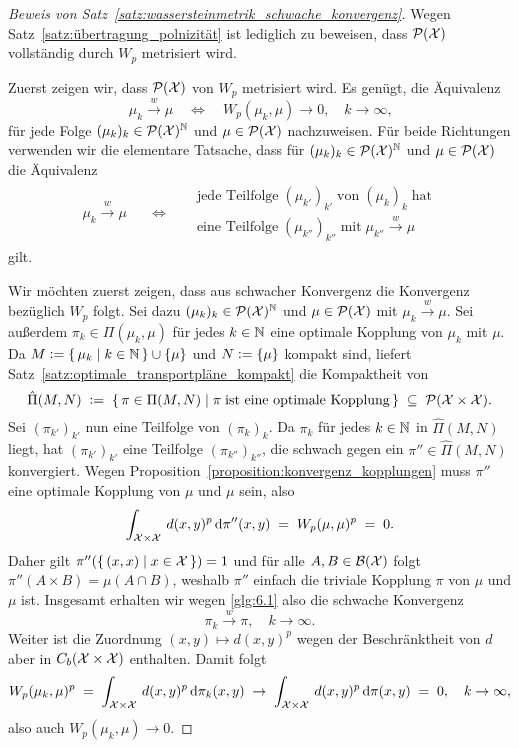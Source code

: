 \documentclass[../thesis/thesis.tex]{subfiles}
\begin{document}
	\begin{proof}[Beweis von Satz~\ref{satz:wassersteinmetrik_schwache_konvergenz}]
		Wegen Satz~\ref{satz:übertragung_polnizität} ist lediglich zu beweisen, dass $\mathcal{P}(\mathcal{X})$ vollständig durch $W_p$ metrisiert wird. 
		
		Zuerst zeigen wir, dass $\mathcal{P}(\mathcal{X})$ von $W_p$ metrisiert wird. Es genügt, die Äquivalenz
		\[ \mu_k \xrightarrow{w} \mu \quad \iff \quad W_p(\mu_k, \mu) \to 0, \quad k \to \infty \text{,} \]
		für jede Folge $(\mu_k)_k \in \mathcal{P}(\mathcal{X})^{\mathbb{N}}$ und $\mu \in \mathcal{P}(\mathcal{X})$ nachzuweisen.
		Für beide Richtungen verwenden wir die elementare Tatsache, dass für $(\mu_k)_k \in \mathcal{P}(\mathcal{X})^{\mathbb{N}}$ und $\mu \in \mathcal{P}(\mathcal{X})$ die Äquivalenz
		\[ \begin{matrix}
			\mu_k \xrightarrow{w} \mu \quad & \iff & \quad \begin{array}{lr}
				\text{jede Teilfolge} \; (\mu_{k'})_{k'} \; \text{von} \; (\mu_k)_k \; \text{hat} \\
				\text{eine Teilfolge} \; (\mu_{k''})_{k''} \; \text{mit} \; \mu_{k''} \xrightarrow{w} \mu
			\end{array} \label{glg:6.1} \tag{6.1}
		\end{matrix} \]
		gilt.
		
		Wir möchten zuerst zeigen, dass aus schwacher Konvergenz die Konvergenz bezüglich $W_p$ folgt. Sei dazu $(\mu_k)_k \in \mathcal{P}(\mathcal{X})^{\mathbb{N}}$ und $\mu \in \mathcal{P}(\mathcal{X})$ mit $\mu_k \xrightarrow{w} \mu$. Sei außerdem $\pi_k \in \Pi(\mu_k, \mu)$ 
		für jedes $k \in \mathbb{N}$ eine optimale Kopplung von $\mu_k$ mit $\mu$. 
		Da $M \vcentcolon = \left\{\, \mu_k \; \middle| \; k \in \mathbb{N} \,\right\} \cup \left\{\mu\right\}$ und $N \vcentcolon = \left\{\mu\right\}$ kompakt sind, liefert Satz~\ref{satz:optimale_transportpläne_kompakt} die Kompaktheit von
		\[ \hat{\Pi}(M, N) \; \vcentcolon = \; \left\{\, \pi \in \Pi(M, N) \; \middle| \; \pi \; \text{ist eine optimale Kopplung} \,\right\} \; \subseteq \; \mathcal{P}(\mathcal{X} \times \mathcal{X}) \text{.} \]
		Sei $(\pi_{k'})_{k'}$ nun eine Teilfolge von $(\pi_k)_k$. Da $\pi_k$ für jedes $k \in \mathbb{N}$ in $\hat{\Pi}(M, N)$ liegt, hat $(\pi_{k'})_{k'}$ eine Teilfolge $(\pi_{k''})_{k''}$, 
		die schwach gegen ein $\pi'' \in \hat{\Pi}(M, N)$ konvergiert. Wegen Proposition~\ref{proposition:konvergenz_kopplungen} muss $\pi''$ eine optimale Kopplung von $\mu$ und $\mu$ sein, also
		\[ \int_{\mathcal{X} \times \mathcal{X}} \, d(x, y)^p \, \mathrm{d}\pi''(x, y) \; = \; W_p(\mu, \mu)^p \; = \; 0 \text{.} \]
		Daher gilt $\pi''(\left\{\, (x, x) \; \middle| \; x \in \mathcal{X} \,\right\}) = 1$ und für alle $A, B \in \mathcal{B}(\mathcal{X})$ folgt $\pi''(A \times B) = \mu(A \cap B)$, weshalb $\pi''$ einfach die 
		triviale Kopplung $\pi$ von $\mu$ und $\mu$ ist. Insgesamt erhalten wir wegen \eqref{glg:6.1} also die schwache Konvergenz
		\[ \pi_k \xrightarrow{w} \pi, \quad k \to \infty \text{.} \] 
		Weiter ist die Zuordnung $(x, y) \mapsto d(x, y)^p$ wegen der Beschränktheit von $d$ aber in $C_b(\mathcal{X} \times \mathcal{X})$ enthalten. Damit folgt 
		\[ W_p(\mu_k, \mu)^p \; = \; \int_{\mathcal{X} \times \mathcal{X}} \, d(x, y)^p \, \mathrm{d}\pi_k(x, y) \; \to \; \int_{\mathcal{X} \times \mathcal{X}} \, d(x, y)^p \, \mathrm{d}\pi(x, y) \; = \; 0, \quad k \to \infty \text{,} \]
		also auch $W_p(\mu_k, \mu) \to 0$.
		

\end{proof}
\end{document}
